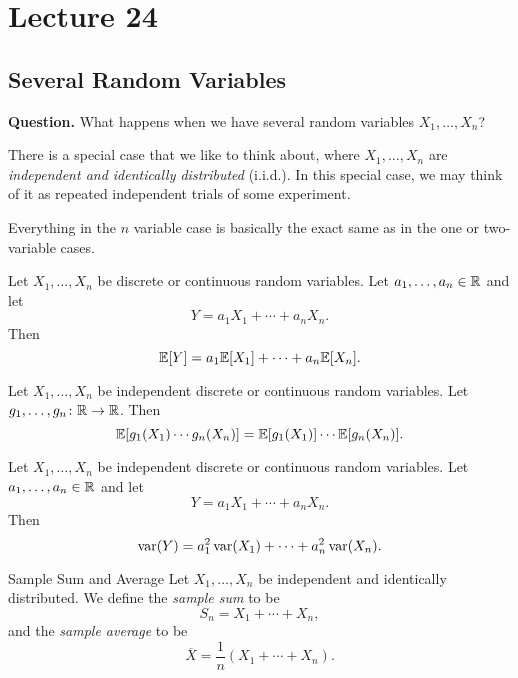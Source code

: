 \documentclass[class=article, crop=false]{standalone}
\begin{document}
  \section{Lecture 24}
  \subsection{Several Random Variables}
  \textbf{Question.} What happens when we have several random variables $X_1,\dotsc,X_n$? \par
  There is a special case that we like to think about, where $X_1,\dotsc,X_n$ are \emph{independent and identically distributed} (i.i.d.). In this special case, we may think of it as repeated independent trials of some experiment.
  \begin{note}{}
    Everything in the $n$ variable case is basically the exact same as in the one or two-variable cases.
  \end{note}
  \begin{theorem}{}
    Let $X_1,\dotsc,X_n$ be discrete or continuous random variables. Let $a_1,\dotsc,a_n\in \mathbb{R}$ and let
    \[
      Y = a_1X_1 + \dotsb + a_nX_n.
    \]
    Then
    \[
      \mathbb{E}[Y] = a_1\mathbb{E}[X_1] + \dotsb + a_n\mathbb{E}[X_n].
    \]
  \end{theorem}
  \begin{theorem}{}
    Let $X_1,\dotsc,X_n$ be independent discrete or continuous random variables. Let $g_1,\dotsc,g_n\colon \mathbb{R}\to \mathbb{R}$. Then
    \[
      \mathbb{E}[g_1(X_1)\dotsb g_n(X_n)] = \mathbb{E}[g_1(X_1)]\dotsb\mathbb{E}[g_n(X_n)].
    \]
  \end{theorem}
  \begin{theorem}{}
    Let $X_1,\dotsc,X_n$ be independent discrete or continuous random variables. Let $a_1,\dotsc,a_n\in \mathbb{R}$ and let
    \[
      Y = a_1X_1 + \dotsb + a_nX_n.
    \]
    Then
    \[
      \operatorname{var}(Y) = a_1^2\operatorname{var}(X_1) + \dotsb + a_n^2\operatorname{var}(X_n).
    \]
  \end{theorem}
  \begin{definition}{Sample Sum and Average}
    Let $X_1,\dotsc,X_n$ be independent and identically distributed. We define the \emph{sample sum} to be
    \[
      S_n = X_1 + \dotsb + X_n,
    \]
    and the \emph{sample average} to be
    \[
      \overline{X} = \frac{1}{n}(X_1 + \dotsb + X_n).
    \]
  \end{definition}
\end{document}
